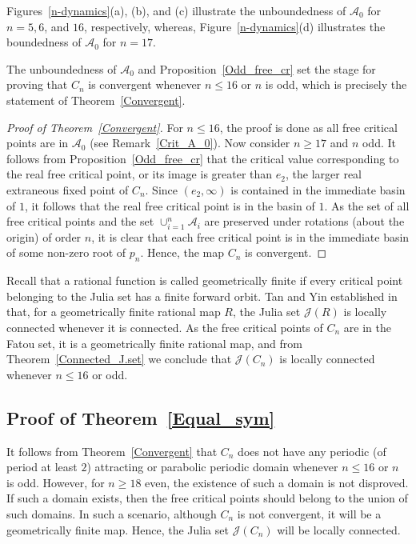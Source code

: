 \documentclass[12pt]{article}
\begin{document}
 Figures~\ref{n-dynamics}(a), (b), and (c) illustrate the unboundedness of $\mathcal{A}_0$ for $n=5,6$, and $16$, respectively, whereas, Figure~\ref{n-dynamics}(d) illustrates the boundedness of $\mathcal{A}_0$ for $n=17$.

 The unboundedness of $\mathcal{A}_0$ and Proposition~\ref{Odd_free_cr} set the stage for proving that $C_n$ is convergent whenever $n\leq16$ or $n$ is odd, which is precisely the statement of Theorem~\ref{Convergent}.

\begin{proof}[Proof of Theorem~\ref{Convergent}]
For $n \leq 16$, the proof is done as all free critical points are in $\mathcal{A}_0$ (see Remark~\ref{Crit_A_0}). Now consider $n \geq 17$ and $n$ odd. It follows from Proposition~\ref{Odd_free_cr} that the critical value corresponding to the real free critical point, or its image is greater than $e_2$, the larger real extraneous fixed point of $C_n$. Since $(e_2, \infty)$ is contained in the immediate basin of $1$, it follows that the real free critical point  is in the basin of $1$. As the set of all free critical points  and the set  $\cup_{i=1}^{n} \mathcal{A}_i$ are preserved under rotations (about the origin) of order $n$, it is clear that each free critical point is in the immediate basin of some non-zero root of $p_n$.  Hence, the map $C_n$ is convergent.
\end{proof}


Recall that a rational function is called geometrically finite if every critical point belonging to the Julia set has a finite forward orbit. Tan and Yin established in \cite[Theorem A]{Tan1996} that, for a geometrically finite rational map $R$, the Julia set $\mathcal{J}(R)$ is locally connected whenever it is connected. As the free critical points of $C_n$ are in the Fatou set, it is a geometrically finite rational map, and from Theorem~\ref{Connected_J.set} we conclude that $\mathcal{J}(C_n)$ is locally connected whenever $n\leq 16$ or odd.


\subsection{Proof of Theorem~\ref{Equal_sym}}

	It follows from Theorem~\ref{Convergent} that $C_n$ does not have any periodic (of period at least $2$) attracting or parabolic periodic domain whenever $n \leq 16$ or $n$ is odd. However, for $n\geq 18$ even, the existence of such a domain is not disproved. If such a domain exists, then the free critical points should belong to the union of such domains. In such a scenario, although $C_n$ is not convergent, it will be a geometrically finite map. Hence, the Julia set $\mathcal{J}(C_n)$ will be locally connected.
	
\end{document}
